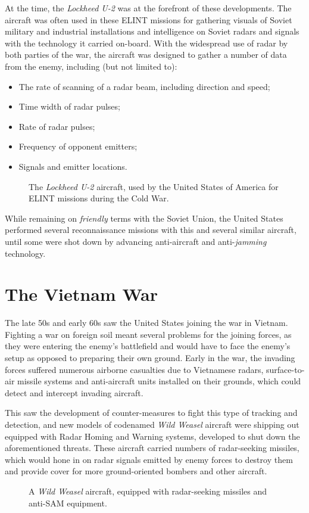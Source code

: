 \documentclass[english,purist]{ist-report}
\begin{document}
At the time, the \textit{Lockheed U-2} was at the forefront of these developments. The aircraft was often used in these ELINT missions for gathering visuals of Soviet military and industrial installations and intelligence on Soviet radars and signals with the technology it carried on-board. With the widespread use of radar by both parties of the war, the aircraft was designed to gather a number of data from the enemy, including (but not limited to):
\begin{itemize}
    \item The rate of scanning of a radar beam, including direction and speed;
    \item Time width of radar pulses;
    \item Rate of radar pulses;
    \item Frequency of opponent emitters;
    \item Signals and emitter locations.
\end{itemize}
\begin{figure}[ht]
    \centering
    \caption{The \textit{Lockheed U-2} aircraft, used by the United States of America for ELINT missions during the Cold War.}
    \label{fig:u-2}
\end{figure}

While remaining on \textit{friendly} terms with the Soviet Union, the United States performed several reconnaissance missions with this and several similar aircraft, until some were shot down by advancing anti-aircraft and anti-\textit{jamming} technology.

\section{The Vietnam War}

The late 50s and early 60s saw the United States joining the war in Vietnam. Fighting a war on foreign soil meant several problems for the joining forces, as they were entering the enemy's battlefield and would have to face the enemy's setup as opposed to preparing their own ground. Early in the war, the invading forces suffered numerous airborne casualties due to Vietnamese radars, surface-to-air missile systems and anti-aircraft units installed on their grounds, which could detect and intercept invading aircraft.

This saw the development of counter-measures to fight this type of tracking and detection, and new models of codenamed \textit{Wild Weasel} aircraft were shipping out equipped with Radar Homing and Warning systems, developed to shut down the aforementioned threats. These aircraft carried numbers of radar-seeking missiles, which would hone in on radar signals emitted by enemy forces to destroy them and provide cover for more ground-oriented bombers and other aircraft.
\begin{figure}[ht]
    \centering
    \caption{A \textit{Wild Weasel} aircraft, equipped with radar-seeking missiles and anti-SAM equipment.}
    \label{fig:wildweasel}
\end{figure}
\end{document}
